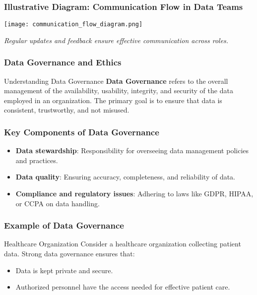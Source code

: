 \documentclass[aspectratio=169]{beamer}
\begin{document}
\begin{frame}[fragile]
    \frametitle{Illustrative Diagram: Communication Flow in Data Teams}
    \begin{center}
        \texttt{[image: communication\_flow\_diagram.png]} %
    \end{center}
    \textit{Regular updates and feedback ensure effective communication across roles.}
\end{frame}

\begin{frame}[fragile]
    \frametitle{Data Governance and Ethics}
    \begin{block}{Understanding Data Governance}
      \textbf{Data Governance} refers to the overall management of the availability, usability, integrity, and security of the data employed in an organization. The primary goal is to ensure that data is consistent, trustworthy, and not misused.
    \end{block}
\end{frame}

\begin{frame}[fragile]
    \frametitle{Key Components of Data Governance}
    \begin{itemize}
        \item \textbf{Data stewardship}: Responsibility for overseeing data management policies and practices.
        \item \textbf{Data quality}: Ensuring accuracy, completeness, and reliability of data.
        \item \textbf{Compliance and regulatory issues}: Adhering to laws like GDPR, HIPAA, or CCPA on data handling.
    \end{itemize}
\end{frame}

\begin{frame}[fragile]
    \frametitle{Example of Data Governance}
    \begin{block}{Healthcare Organization}
        Consider a healthcare organization collecting patient data. Strong data governance ensures that:
        \begin{itemize}
            \item Data is kept private and secure.
            \item Authorized personnel have the access needed for effective patient care.
        \end{itemize}
    \end{block}
\end{frame}
\end{document}
